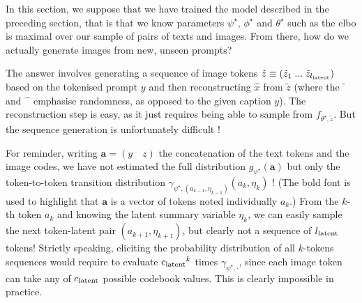\documentclass{article}
\begin{document}
\begin{multicols}{2}
In this section, we suppose that we have trained the model described in the preceding section, that is that we know parameters $\psi^\star$, $\phi^\star$ and $\theta^\star$ such as the \gls{elbo} is maximal over our sample of pairs of texts and images. From there, how do we actually generate images from new, unseen prompts?

The answer involves generating a sequence of image tokens $\tilde z\equiv (\tilde z_1 \; ... \; \tilde z_{{l_{\mathrm{latent}}}})$ based on the tokenised prompt $y$ and then reconstructing $\hat x$ from $ \tilde z$ (where the $\tilde{\phantom{z}}$ and $\hat{\phantom{x}}$ emphasise randomness, as opposed to the given caption $y$). The reconstruction step is easy, as it just requires being able to sample from $f_{\theta^\star, \tilde z}$. But the sequence generation is unfortunately difficult !

For reminder, writing $\mathbf{a}=(y \quad z)$ the concatenation of the text tokens and the image codes, we have not estimated the full distribution $g_{\psi^\star}(\mathbf{a})$ but only the token-to-token transition distribution $\gamma_{\psi^\star,(a_{k-1},\eta_{k-1})}(a_k,\eta_k)$ ! (The bold font is used to highlight that $\mathbf{a}$ is a vector of tokens noted individually $a_k$.) From the $k$-th token $a_k$ and knowing the latent summary variable $\eta_k$, we can easily sample the next token-latent pair $(a_{k+1},\eta_{k+1})$, but clearly not a sequence of ${l_{\mathrm{latent}}}$ tokens! Strictly speaking, eliciting the probability distribution of all $k$-tokens sequences would require to evaluate ${c_{\mathrm{latent}}}^k$ times $\gamma_{\psi^\star,\cdot}$, since each image token can take any of ${c_{\mathrm{latent}}}$ possible codebook values. This is clearly impossible in practice.


\end{multicols}
\end{document}

